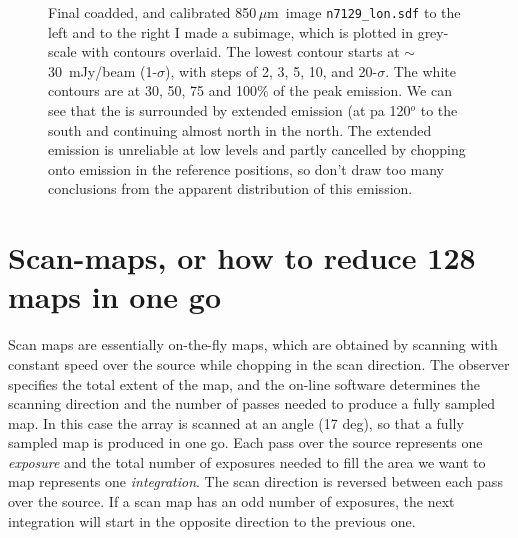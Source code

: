 \documentclass[twoside,11pt]{article}
\newcommand{\mic}{\mbox{\,${\mu}$m}}               %
\newcommand{\xlabel}[1]{}
\begin{document}
{%
\begin{figure}
\begin{center}
\caption{Final coadded, and calibrated 850\mic\ image \texttt{n7129\_lon.sdf} to the
left and to the right I made a subimage, which is plotted in grey-scale with
contours overlaid. The lowest contour starts at $\sim$ 30~mJy/beam
(1-$\sigma$), with steps of 2, 3, 5, 10, and 20-$\sigma$. The white contours
are at 30, 50, 75 and 100\% of the peak emission.  We can see that the is
surrounded by extended emission (at pa 120$^o$ to the south and continuing
almost north in the north. The extended emission is unreliable at low levels
and partly cancelled by chopping onto emission in the reference positions, so
don't draw too many conclusions from the apparent distribution of this
emission.}
\label{fig:image}
\end{center}
\end{figure}


\section{\xlabel{scan-maps_or_how_to_reduce_128_maps_in_one_go}Scan-maps, or how to reduce 128 maps in one go}

Scan maps are essentially on-the-fly maps, which are obtained by
scanning with constant speed over the source while chopping in the scan
direction. The observer specifies the total extent of the map, and the
on-line software determines the scanning direction and the number of
passes needed to produce a fully sampled map. In this case the array is
scanned at an angle (17 deg), so that a fully sampled map is produced
in one go. Each pass over the source represents one {\it
exposure} and the total number of exposures needed to fill the area we
want to map represents one {\it integration}. The scan direction is
reversed between each pass over the source. If a scan map has an odd
number of exposures, the next integration will start in the opposite
direction to the previous one.

}
\end{document}
